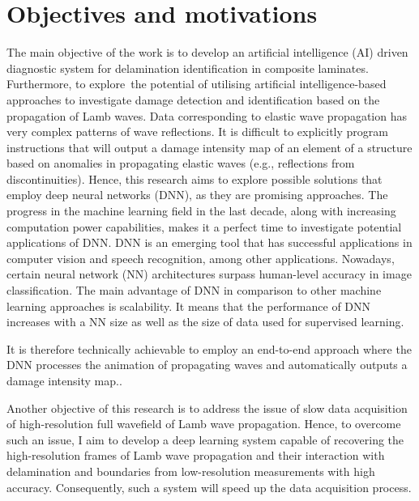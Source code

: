 \section{Objectives and motivations}
\label{sec13}

The main objective of the work is to develop an artificial intelligence (AI) driven diagnostic system for delamination identification in composite laminates.
Furthermore, to explore the potential of utilising artificial intelligence-based approaches to investigate damage detection and identification based on the propagation of Lamb waves.
Data corresponding to elastic wave propagation has very complex patterns of wave reflections. 
It is difficult to explicitly program instructions that will output a damage intensity map of an element of a structure based on anomalies in propagating elastic waves (e.g., reflections from discontinuities).
Hence, this research aims to explore possible solutions that employ deep neural networks (DNN), as they are promising approaches.
The progress in the machine learning field in the last decade, along with increasing computation power capabilities, makes it a perfect time to investigate potential applications of DNN. 
DNN is an emerging tool that has successful applications in computer vision and speech recognition, among other applications. 
Nowadays, certain neural network (NN) architectures surpass human-level accuracy in image classification. 
The main advantage of DNN in comparison to other machine learning approaches is scalability. 
It means that the performance of DNN increases with a NN size as well as the size of data used for supervised learning. 

It is therefore technically achievable to employ an end-to-end approach where the DNN processes the animation of propagating waves and automatically outputs a damage intensity map..

Another objective of this research is to address the issue of slow data acquisition of high-resolution full wavefield of Lamb wave propagation.
Hence, to overcome such an issue, I aim to develop a deep learning system capable of recovering the high-resolution frames of Lamb wave propagation and their interaction with delamination and boundaries from low-resolution measurements with high accuracy.
Consequently, such a system will speed up the data acquisition process.


